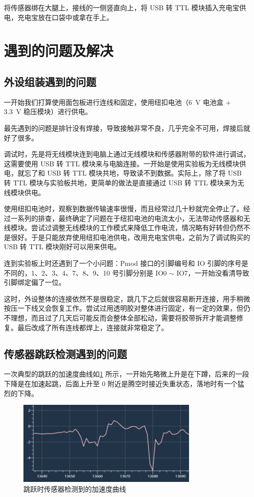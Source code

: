 \documentclass[UTF8, 11pt, fontset=none]{ctexart}
\begin{document}
将传感器绑在大腿上，接线的一侧竖直向上，将 USB 转 TTL 模块插入充电宝供电，充电宝放在口袋中或拿在手上。

\section{遇到的问题及解决}

\subsection{外设组装遇到的问题}

一开始我们打算使用面包板进行连线和固定，使用纽扣电池（\SI{6}{\volt} 电池盒 + \SI{3.3}{\volt} 稳压模块）进行供电。

最先遇到的问题是排针没有焊接，导致接触非常不良，几乎完全不可用，焊接后就好了很多。

调试时，先是将无线模块连到电脑上通过无线模块和传感器附带的软件进行调试，这需要使用 USB 转 TTL 模块来与电脑连接。一开始是使用实验板为无线模块供电，就忘了和 USB 转 TTL 模块共地，导致读不到数据。实际上，除了将 USB 转 TTL 模块与实验板共地，更简单的做法是直接通过 USB 转 TTL 模块来为无线模块供电。

使用纽扣电池时，观察到数据传输速率很慢，而且经常过几十秒就完全停止了。经过一系列的排查，最终确定了问题在于纽扣电池的电流太小，无法带动传感器和无线模块。尝试过调整无线模块的工作模式来降低工作电流，情况略有好转但仍然不是很好。于是只能放弃使用纽扣电池供电，改用充电宝供电，之前为了调试购买的 USB 转 TTL 模块刚好可以用来供电。

连到实验板上时还遇到了一个小问题：Pmod 接口的引脚编号和 IO 引脚的序号是不同的，1、2、3、4、7、8、9、10 号引脚分别是 IO0 $\sim$ IO7，一开始没看清导致引脚绑定偏了一位。

这时，外设整体的连接依然不是很稳定，跳几下之后就很容易断开连接，用手稍微按压一下线又会恢复工作。尝试过用透明胶对整体进行固定，有一定的效果，但仍不理想，而且过了几天后可能反而会整体全部松动，需要将胶带拆开才能调整修复。最后改成了所有连线都焊上，连接就非常稳定了。

\subsection{传感器跳跃检测遇到的问题}

一次典型的跳跃的加速度曲线如\cref{sensor-jump} 所示，一开始先略微上升是在下蹲，后来的一段下降是在加速起跳，后面上升至 0 附近是腾空时接近失重状态，落地时有一个猛烈的下降。

\begin{figure}[ht]
    \centering
    \includegraphics[width=0.8\textwidth]{images/sensor-jump.png}
    \caption{跳跃时传感器检测到的加速度曲线}
    \label{sensor-jump}
\end{figure}
\end{document}
